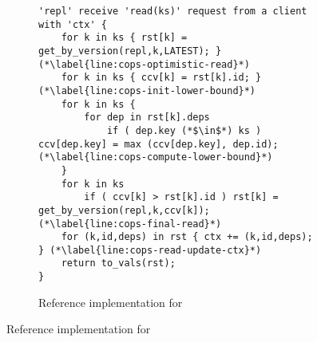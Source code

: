\begin{figure}[!hp]
\vspace{-10pt}
\begin{subfigure}{\textwidth}

\begin{lstlisting}
'repl' receive 'read(ks)' request from a client with 'ctx' {
    for k in ks { rst[k] = get_by_version(repl,k,LATEST); } (*\label{line:cops-optimistic-read}*)
    for k in ks { ccv[k] = rst[k].id; } (*\label{line:cops-init-lower-bound}*)
    for k in ks { 
        for dep in rst[k].deps 
            if ( dep.key (*$\in$*) ks ) ccv[dep.key] = max (ccv[dep.key], dep.id); (*\label{line:cops-compute-lower-bound}*) 
    } 
    for k in ks 
        if ( ccv[k] > rst[k].id ) rst[k] = get_by_version(repl,k,ccv[k]); (*\label{line:cops-final-read}*)
    for (k,id,deps) in rst { ctx += (k,id,deps); } (*\label{line:cops-read-update-ctx}*)
    return to_vals(rst); 
}                                   
\end{lstlisting}

\caption{Reference implementation for \pcopsread}
\label{lst:cops-read}

\end{subfigure}

\hrulefill


\end{figure}
